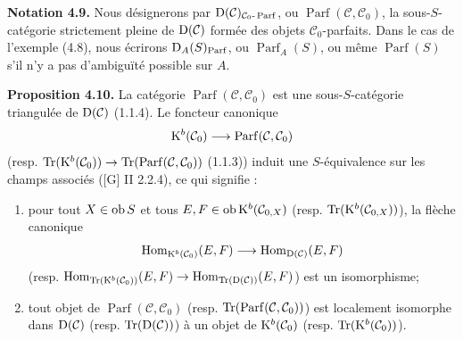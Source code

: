 \documentclass[11pt]{article}
\newcommand{\Parf}{\operatorname{Parf}}
\begin{document}
\textbf{Notation 4.9.} Nous désignerons par \(\Dpx(\mathcal C)_{\mathcal C_0\text{-}\Parf}\), ou \(\Parf(\mathcal C,\mathcal C_0)\), la sous-\(S\)-catégorie strictement pleine de \(\mathrm D(\mathcal C)\) formée des objets \(\mathcal C_0\)-parfaits. Dans le cas de l'exemple (4.8), nous écrirons \(\Dpx_A(S)_{\Parf}\), ou \(\Parf_A(S)\), ou même \(\Parf(S)\) s'il n'y a pas d'ambiguïté possible sur \(A\).

\textbf{Proposition 4.10.} La catégorie \(\Parf(\mathcal C,\mathcal C_0)\) est une sous-\(S\)-catégorie triangulée de \(\mathrm D(\mathcal C)\) (1.1.4). Le foncteur canonique
\[
  \Kpx^b(\mathcal C_0)\longrightarrow\Parf(\mathcal C,\mathcal C_0)
\]
(resp. \(\Tr(\Kpx^b(\mathcal C_0))\to\Tr(\Parf(\mathcal C,\mathcal C_0))\) (1.1.3)) induit une \(S\)-équivalence sur les champs associés ([G] II 2.2.4), ce qui signifie :
\begin{enumerate}[label=(\roman*)]
\item pour tout \(X\in\operatorname{ob} S\) et tous \(E,F\in\operatorname{ob}\mathrm K^b(\mathcal C_{0,X})\) (resp. \(\operatorname{Tr}(\mathrm K^b(\mathcal C_{0,X}))\)), la flèche canonique
\[
  \operatorname{Hom}_{\mathrm K^b(\mathcal C_0)}(E,F)
  \longrightarrow
  \operatorname{Hom}_{\mathrm D(\mathcal C)}(E,F)
\]
(resp. \(\operatorname{Hom}_{\operatorname{Tr}(\mathrm K^b(\mathcal C_0))}(E,F)\to\operatorname{Hom}_{\operatorname{Tr}(\mathrm D(\mathcal C))}(E,F)\)) est un isomorphisme;
\item tout objet de \(\Parf(\mathcal C,\mathcal C_0)\) (resp. \(\Tr(\Parf(\mathcal C,\mathcal C_0))\)) est localement isomorphe dans \(\mathrm D(\mathcal C)\) (resp. \(\operatorname{Tr}(\mathrm D(\mathcal C))\)) à un objet de \(\mathrm K^b(\mathcal C_0)\) (resp. \(\operatorname{Tr}(\mathrm K^b(\mathcal C_0))\)).
\end{enumerate}
\end{document}
